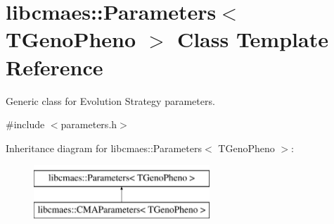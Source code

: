 \hypertarget{classlibcmaes_1_1Parameters}{\section{libcmaes\+:\+:Parameters$<$ T\+Geno\+Pheno $>$ Class Template Reference}
\label{classlibcmaes_1_1Parameters}
}


Generic class for Evolution Strategy parameters.  




{\ttfamily \#include $<$parameters.\+h$>$}

Inheritance diagram for libcmaes\+:\+:Parameters$<$ T\+Geno\+Pheno $>$\+:\begin{figure}[H]
\begin{center}
\leavevmode
\includegraphics[height=2.000000cm]{classlibcmaes_1_1Parameters}
\end{center}
\end{figure}
